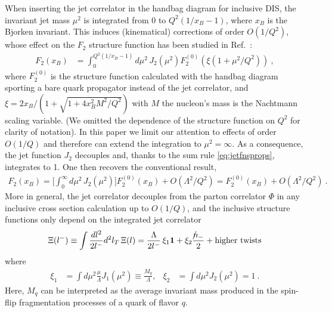 \documentclass[preprintnumbers,floatfix,nofootinbib]{revtex4}
\newcommand{\nslash}{n \hspace{-0.24cm} / \,}
\newcommand{\mj}{M_q}
\newcommand{\mjs}{\langle m_j^2 \rangle>}
\begin{document}
When inserting the jet correlator in the handbag diagram for inclusive DIS,
the invariant jet mass $\mu^2$ is integrated from 0 to $Q^2(1/x_B-1)$, where $x_B$ is the Bjorken invariant. This
induces (kinematical) corrections of order $O(1/Q^2)$, whose effect on the
$F_2$ structure function has been studied in Ref.~\cite{Accardi:2008ne}: 
\begin{align}
  F_2(x_B) & = \int_0^{Q^2(1/x_B-1)}d\mu^2\, J_2(\mu^2) F_2^{(0)}(\xi(1+\mu^2/Q^2)) \ ,
\label{eq:F2}
\end{align}
where $F_2^{(0)}$ is the structure function calculated with the handbag
diagram sporting a bare quark propagator instead of the jet correlator, and
$\xi=2x_B/(1+\sqrt{1+4x_B^2M^2/Q^2})$ with $M$ the nucleon's mass is the
Nachtmann scaling variable. (We omitted the dependence of the structure
function on $Q^2$ for clarity of notation). In this paper we limit our
attention to effects of order $O(1/Q)$ and therefore can extend the
integration to $\mu^2=\infty$. As a consequence, the jet function $J_2$ decouples and, thanks to the sum rule \eqref{eq:jetfnsprops}, integrates to 1. One then recovers the conventional result, 
\begin{align}
  F_2(x_B) = \Big[ \int_0^\infty d\mu^2\, J_2(\mu^2) \Big] F_2^{(0)}(x_B) 
     + O(\Lambda^2/Q^2) = F_2^{(0)}(x_B)  + O(\Lambda^2/Q^2) \ .
\end{align}
%
More in general, the jet correlator decouples from the parton correlator $\Phi$ in any inclusive cross section calculation up to $O(1/Q)$, and the inclusive structure functions only depend on the integrated jet correlator 
\begin{equation} 
  \Xi(l^-) \equiv \int \frac{dl^2}{2l^-} d^2 l_T \, \Xi(l) 
    =  \frac{\Lambda}{2 l^-}\,\xi_1 {\bm 1}
    +  \xi_2 \frac{\nslash_-}{2} 
    + \text{higher\ twists}
\end{equation} 
where 
\begin{align}
\xi_1 &= \int d\mu^2 \frac{\mu}{\Lambda} J_1(\mu^2) 
       \equiv \frac{\mj}{\Lambda},
&
\xi_2 &= \int d\mu^2 J_2(\mu^2) = 1 \ .
\end{align} 
Here, $\mj$ can be interpreted as the average invariant mass produced in the spin-flip fragmentation processes of a quark of flavor $q$.
\end{document}
